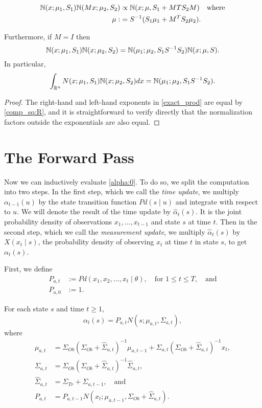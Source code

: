 \documentclass[12pt,leqno]{article}
\begin{document}
\begin{Cor}\label{comp_sq:2}
\begin{align*}
  {\mathbb N}(x;\mu_1,S_1){\mathbb N}(Mx;\mu_2,S_2) &\propto {\mathbb N}(x;\mu,S_1 + MTS_2M)\quad\text{where}\\
 \mu :&= S^{-1}(S_1\mu_1 + M^TS_2\mu_2). 
\end{align*}

Furthermore, if $M = I$ then 
\begin{equation}\label{exact_prod} 
  {\mathbb N}(x;\mu_1,S_1){\mathbb N}(x;\mu_2,S_2) = {\mathbb N}(\mu_1;\mu_2,S_1S^{-1}S_2){\mathbb N}(x;\mu,S).
\end{equation}
In particular,
\begin{equation}
  \int_{{\mathbb R}^n}N(x;\mu_1,S_1){\mathbb N}(x;\mu_2,S_2)dx = {\mathbb N}(\mu_1;\mu_2,S_1S^{-1}S_2).
  \end{equation}
\begin{proof}
  The right-hand and left-hand exponents in \eqref{exact_prod} are equal by \eqref{comp_sq:R}, and it is
  straightforward to verify directly that the normalization factors outside the exponentials are also equal. 
\end{proof}
\end{Cor}


\section{The Forward Pass}
  Now we can inductively evaluate \eqref{alpha:0}. To do so, we split the computation
  into two steps.  In the first step, which we call the {\em time update}, we multiply
  $\alpha_{t-1}(u)$ by the state transition function $Pd(s\mid u)$ and integrate with respect
  to $u$. We will denote the result of the time update by $\hat{\alpha}_t(s)$.  It is the joint probability
  density of observations $x_1,\dots,x_{t-1}$ and state $s$ at time $t$.
  Then in the second step, which we call the {\em measurement update}, we multiply
  $\hat{\alpha}_t(s)$ by $X(x_t \mid s)$, the probability density of observing $x_t$ at time $t$
  in state $s$, to get $\alpha_t(s)$.

  First, we define
\begin{align*}
  P_{a,t} &:= Pd(x_1,x_2,\dots,x_t \mid \theta),\quad\text{for $1\le t\le T$},\quad\text{and}\\
  P_{a,0} &:= 1.
\end{align*}

\begin{Thm}\label{alpha:1}
  For each state $s$ and time $t \ge 1$,
$$
  \alpha_t(s) = P_{a,t}N(s;\mu_{a,t},\Sigma_{a,t}),
$$
where
\begin{align*}
  \mu_{a,t} &= \Sigma_{Ob}(\Sigma_{Ob}+\widehat{\Sigma}_{a,t})^{-1}\mu_{a,t-1}
  + \widehat{\Sigma}_{a,t}(\Sigma_{Ob}+\widehat{\Sigma}_{a,t})^{-1}x_t, \\
  \Sigma_{a,t} &= \Sigma_{Ob}(\Sigma_{Ob}+\widehat{\Sigma}_{a,t})^{-1}\widehat{\Sigma}_{a,t},\\
  \widehat{\Sigma}_{a,t} &= \Sigma_{Tr}+\Sigma_{a,t-1},
 \quad\text{and}\\
  P_{a,t} &=P_{a,t-1}N(x_t;\mu_{a,t-1},\Sigma_{Ob} + \widehat{\Sigma}_{a,t}).
\end{align*}
\end{Thm}
\end{document}
